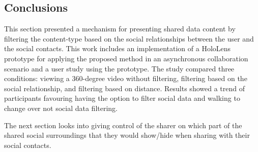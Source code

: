 \subsection{Conclusions}

This section presented a mechanism for presenting shared data content by filtering the content-type based on the social relationships between the user and the social contacts. This work includes an implementation of a HoloLens prototype for applying the proposed method in an asynchronous collaboration scenario and a user study using the prototype. The study compared three conditions: viewing a 360-degree video without filtering, filtering based on the social relationship, and filtering based on distance. Results showed a trend of participants favouring having the option to filter social data and walking to change over not social data filtering. 

The next section looks into giving control of the sharer on which part of the shared social surroundings that they would show/hide when sharing with their social contacts. 